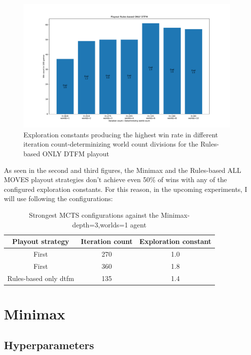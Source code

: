 \begin{figure}[H]
    \caption{Exploration constants producing the highest win rate in different iteration count-determinizing world count divisions for the Rules-based ONLY DTFM playout}
    \centerline{\mbox{\includegraphics[width=180mm]{img/mcts_expl_worldcount_Rules-based ONLY DTFM.pdf}}}
    \label{fig:example}
\end{figure}

As seen in the second and third figures, the Minimax and the Rules-based ALL MOVES playout strategies don't achieve even 50\% of wins with any of the configured
exploration constants. For this reason, in the upcoming experiments, I will use following the configurations:


\begin{table}[H] 
    \centering
    \begin{tabular}{|c|c|c|} 
        \hline
        \textbf{Playout strategy} & \textbf{Iteration count} & \textbf{Exploration constant} \\ \hline
        First & 270 & 1.0 \\ \hline
        First & 360 & 1.8 \\ \hline
        Rules-based only dtfm & 135 & 1.4 \\ \hline
    \end{tabular}
    \caption{Strongest MCTS configurations against the Minimax-depth=3,worlds=1 agent}
\end{table}


\section{Minimax}


\subsection{Hyperparameters} \label{subsec:Minimax_Hyperparameters}

